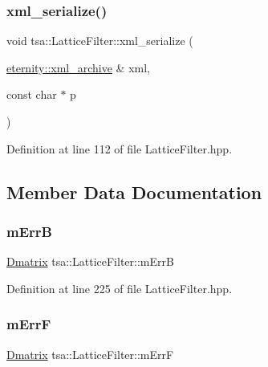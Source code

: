 \subsubsection{\texorpdfstring{xml\+\_\+serialize()}{xml\_serialize()}}
{\footnotesize\ttfamily void tsa\+::\+Lattice\+Filter\+::xml\+\_\+serialize (\begin{DoxyParamCaption}\item[{\hyperlink{classeternity_1_1xml__archive}{eternity\+::xml\+\_\+archive} \&}]{xml,  }\item[{const char $\ast$}]{p }\end{DoxyParamCaption})\hspace{0.3cm}{\ttfamily [inline]}}



Definition at line 112 of file Lattice\+Filter.\+hpp.



\subsection{Member Data Documentation}
\mbox{\label{classtsa_1_1_lattice_filter_a0cd360b9836146c9296798337dd2ee0f}} 
\subsubsection{\texorpdfstring{m\+ErrB}{mErrB}}
{\footnotesize\ttfamily \hyperlink{namespacetsa_ad260cd21c1891c4ed391fe788569aba4}{Dmatrix} tsa\+::\+Lattice\+Filter\+::m\+ErrB\hspace{0.3cm}{\ttfamily [private]}}



Definition at line 225 of file Lattice\+Filter.\+hpp.

\mbox{\label{classtsa_1_1_lattice_filter_a462c5cd31c438a924bfde88d08e12200}} 
\subsubsection{\texorpdfstring{m\+ErrF}{mErrF}}
{\footnotesize\ttfamily \hyperlink{namespacetsa_ad260cd21c1891c4ed391fe788569aba4}{Dmatrix} tsa\+::\+Lattice\+Filter\+::m\+ErrF\hspace{0.3cm}{\ttfamily [private]}}



